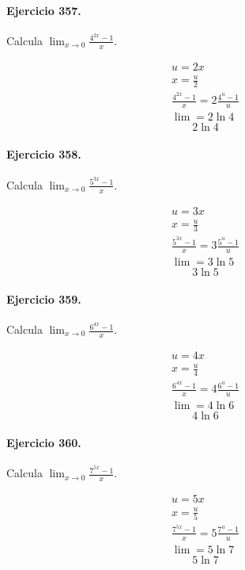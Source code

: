 \documentclass[11pt,a4paper]{article}
\begin{document}
\paragraph{Ejercicio 357.} Calcula $\displaystyle\lim_{x\to0}\frac{4^{2x}-1}{x}$.

\[
\begin{aligned}
u=2x\\
x=\frac{u}{2}\\
\frac{4^{2x}-1}{x}=2\frac{4^u-1}{u}\\
\lim=2\ln 4
\end{aligned}
\]
\[\boxed{2\ln 4}\]


\paragraph{Ejercicio 358.} Calcula $\displaystyle\lim_{x\to0}\frac{5^{3x}-1}{x}$.

\[
\begin{aligned}
u=3x\\
x=\frac{u}{3}\\
\frac{5^{3x}-1}{x}=3\frac{5^u-1}{u}\\
\lim=3\ln 5
\end{aligned}
\]
\[\boxed{3\ln 5}\]


\paragraph{Ejercicio 359.} Calcula $\displaystyle\lim_{x\to0}\frac{6^{4x}-1}{x}$.

\[
\begin{aligned}
u=4x\\
x=\frac{u}{4}\\
\frac{6^{4x}-1}{x}=4\frac{6^u-1}{u}\\
\lim=4\ln 6
\end{aligned}
\]
\[\boxed{4\ln 6}\]


\paragraph{Ejercicio 360.} Calcula $\displaystyle\lim_{x\to0}\frac{7^{5x}-1}{x}$.

\[
\begin{aligned}
u=5x\\
x=\frac{u}{5}\\
\frac{7^{5x}-1}{x}=5\frac{7^u-1}{u}\\
\lim=5\ln 7
\end{aligned}
\]
\[\boxed{5\ln 7}\]
\end{document}
